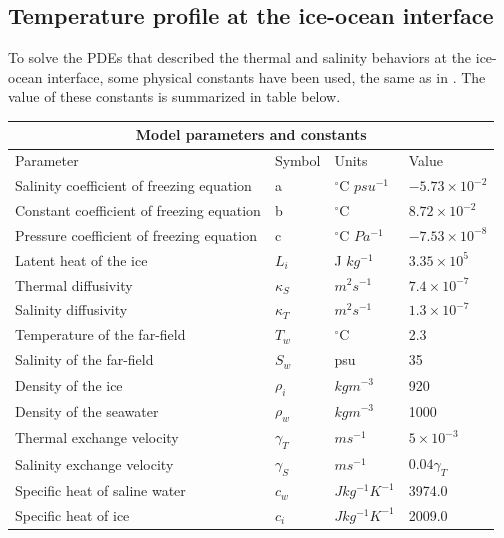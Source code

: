 \documentclass[11pt,a4paper]{article}
\begin{document}
	\subsection{Temperature profile at the ice-ocean interface}
	
	To solve the PDEs that described the thermal and salinity behaviors at the ice-ocean interface, some physical constants have been used, the same as in \cite{jenkins2001role}. The value of these constants is summarized in table below.\\
	
	\begin{tabular}{ |p{8cm}||p{2cm}|p{3cm}|p{2cm}|}
     \hline
     \multicolumn{4}{|c|}{Model parameters and constants} \\
     \hline
     Parameter &Symbol&Units&Value\\
     \hline
     Salinity coefficient of freezing equation &a& $^{\circ}$C $psu^{-1}$&   $-5.73\times10^{-2}$\\
     Constant coefficient of freezing equation &b&  $^{\circ}$C  & $8.72\times 10^{-2}$\\
     Pressure coefficient of freezing equation& c&$^{\circ}$C $Pa^{-1} $& $-7.53\times10^{-8}$\\
     Latent heat of the ice    & $L_i$ & J $kg^{-1}$& $3.35\times 10^{5}$\\
     Thermal diffusivity& $\kappa_S$  & $m^2 s^{-1}$&$7.4\times 10^{-7}$\\
     Salinity diffusivity & $\kappa_T$  & $m^2 s^{-1}$   &$1.3\times 10^{-7}$\\
     Temperature of the far-field& $T_w$  & $^{\circ}$C & 2.3\\
     Salinity of the far-field&$S_w$& psu&  35  \\
     Density of the ice & $\rho_i$& $kg m^{-3}$& 920\\
     Density of the seawater & $\rho_w$ & $kg m^{-3}$& 1000\\
     Thermal exchange velocity & $\gamma_T$ & $m s^{-1}$& $5\times 10^{-3}$\\
     Salinity exchange velocity & $\gamma_S$ & $m s^{-1}$& $0.04\gamma_T$ \\
     Specific heat of saline water& $c_w$ & $J kg^{-1}K^{-1}$ & 3974.0\\
     Specific heat of ice & $c_i$ & $J kg^{-1} K^{-1}$ & 2009.0\\
     \hline
    \end{tabular}
    
\end{document}
